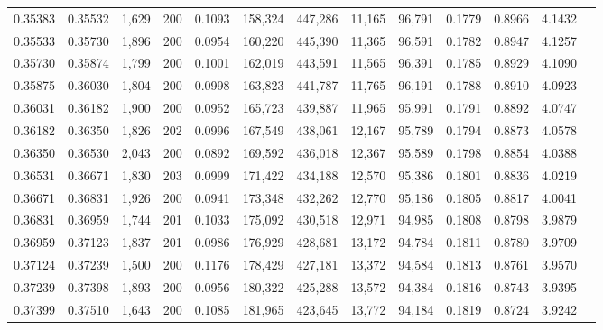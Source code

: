 \begin{tabular}{rrrrrrrrrrrrr}
0.35383 & 0.35532 & 1,629 & 200 &                                     0.1093 & 158,324 & 447,286 &  11,165 &  96,791 & 0.1779 & 0.8966 & 4.1432 \\
0.35533 & 0.35730 & 1,896 & 200 &                                     0.0954 & 160,220 & 445,390 &  11,365 &  96,591 & 0.1782 & 0.8947 & 4.1257 \\
0.35730 & 0.35874 & 1,799 & 200 &                                     0.1001 & 162,019 & 443,591 &  11,565 &  96,391 & 0.1785 & 0.8929 & 4.1090 \\
0.35875 & 0.36030 & 1,804 & 200 &                                     0.0998 & 163,823 & 441,787 &  11,765 &  96,191 & 0.1788 & 0.8910 & 4.0923 \\
0.36031 & 0.36182 & 1,900 & 200 &                                     0.0952 & 165,723 & 439,887 &  11,965 &  95,991 & 0.1791 & 0.8892 & 4.0747 \\
0.36182 & 0.36350 & 1,826 & 202 &                                     0.0996 & 167,549 & 438,061 &  12,167 &  95,789 & 0.1794 & 0.8873 & 4.0578 \\
0.36350 & 0.36530 & 2,043 & 200 &                                     0.0892 & 169,592 & 436,018 &  12,367 &  95,589 & 0.1798 & 0.8854 & 4.0388 \\
0.36531 & 0.36671 & 1,830 & 203 &                                     0.0999 & 171,422 & 434,188 &  12,570 &  95,386 & 0.1801 & 0.8836 & 4.0219 \\
0.36671 & 0.36831 & 1,926 & 200 &                                     0.0941 & 173,348 & 432,262 &  12,770 &  95,186 & 0.1805 & 0.8817 & 4.0041 \\
0.36831 & 0.36959 & 1,744 & 201 &                                     0.1033 & 175,092 & 430,518 &  12,971 &  94,985 & 0.1808 & 0.8798 & 3.9879 \\
0.36959 & 0.37123 & 1,837 & 201 &                                     0.0986 & 176,929 & 428,681 &  13,172 &  94,784 & 0.1811 & 0.8780 & 3.9709 \\
0.37124 & 0.37239 & 1,500 & 200 &                                     0.1176 & 178,429 & 427,181 &  13,372 &  94,584 & 0.1813 & 0.8761 & 3.9570 \\
0.37239 & 0.37398 & 1,893 & 200 &                                     0.0956 & 180,322 & 425,288 &  13,572 &  94,384 & 0.1816 & 0.8743 & 3.9395 \\
0.37399 & 0.37510 & 1,643 & 200 &                                     0.1085 & 181,965 & 423,645 &  13,772 &  94,184 & 0.1819 & 0.8724 & 3.9242 \\

\end{tabular}
